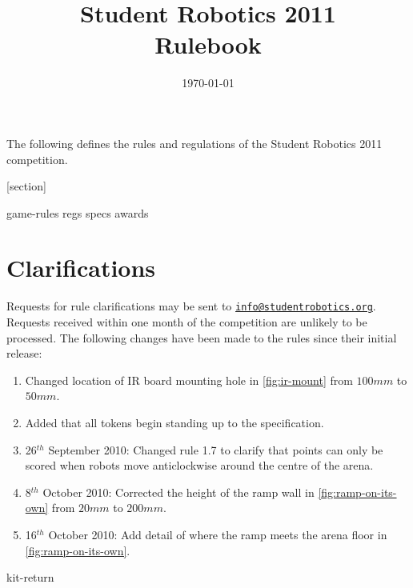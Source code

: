 \documentclass[a4paper, 12pt]{scrartcl}
\title {Student Robotics 2011\\ Rulebook}
\date{\today}
\begin{document}
\maketitle

\noindent The following defines the rules and regulations of the Student Robotics 2011 competition.

[section]
\newcommand{\rcn}{\stepcounter{rule}\arabic{section}.\arabic{rule}}
\renewcommand{\labelenumi}{\rcn}

 {game-rules}
\newpage
 {regs}
\newpage
 {specs}
\newpage
 {awards}

\renewcommand{\labelenumi}{\rcn}

\section{Clarifications}
Requests for rule clarifications may be sent to \href{mailto:info@studentrobotics.org}{\nolinkurl{info@studentrobotics.org}}.  Requests received within one month of the competition are unlikely to be processed.
The following changes have been made to the rules since their initial release:

\begin{enumerate}
\item Changed location of IR board mounting hole in \autoref{fig:ir-mount} from $100mm$ to $50mm$.
\item Added that all tokens begin standing up to the  specification.
\item 26$^{th}$ September 2010: Changed rule 1.7 to clarify that points can only be scored when robots move anticlockwise around the centre of the arena.
\item 8$^{th}$ October 2010: Corrected the height of the ramp wall in \autoref{fig:ramp-on-its-own} from $20mm$ to $200mm$.
\item 16$^{th}$ October 2010: Add detail of where the ramp meets the arena floor in \autoref{fig:ramp-on-its-own}.
\end{enumerate}

\newpage
\appendix
\appendixpage
\addappheadtotoc
 {kit-return}
\end{document}
